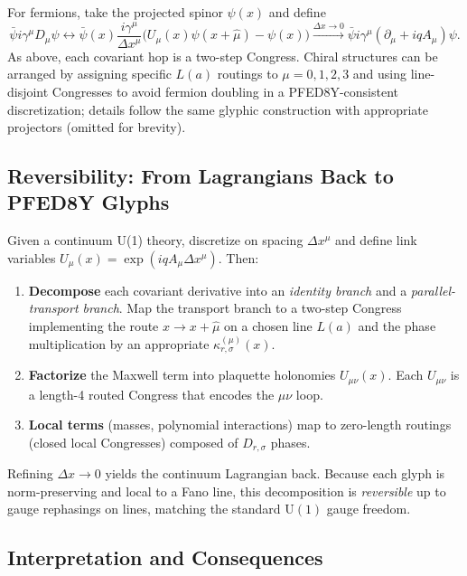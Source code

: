 \documentclass[pdflatex,sn-mathphys-num]{sn-jnl}
\theoremstyle{thmstyleone}
\theoremstyle{thmstyletwo}
\theoremstyle{thmstylethree}
\begin{document}
For fermions, take the projected spinor $\psi(x)$ and define
\begin{equation}
    \bar{\psi} i\gamma^\mu D_\mu\psi 
    \longleftrightarrow 
    \bar{\psi}(x) \frac{i\gamma^\mu}{\Delta x^\mu} \Big(U_\mu(x)\psi(x+\hat{\mu}) - \psi(x)\Big)
    \xrightarrow{\Delta x \to 0}
    \bar{\psi} i\gamma^\mu(\partial_\mu + iq A_\mu)\psi.
\end{equation}
As above, each covariant hop is a two-step Congress. Chiral structures can be arranged by assigning specific $L(a)$ routings to $\mu = 0,1,2,3$ and using line-disjoint Congresses to avoid fermion doubling in a PFED8Y-consistent discretization; details follow the same glyphic construction with appropriate projectors (omitted for brevity).

\subsection{Reversibility: From Lagrangians Back to PFED8Y Glyphs}
\label{subsec:reverse}

Given a continuum U(1) theory, discretize on spacing $\Delta x^\mu$ and define link variables $U_\mu(x) = \exp(iq A_\mu \Delta x^\mu)$. Then:

\begin{enumerate}
    \item \textbf{Decompose} each covariant derivative into an \emph{identity branch} and a \emph{parallel-transport branch}. Map the transport branch to a two-step Congress implementing the route $x \to x+\hat{\mu}$ on a chosen line $L(a)$ and the phase multiplication by an appropriate $\kappa_{r,\sigma}^{(\mu)}(x)$.
    
    \item \textbf{Factorize} the Maxwell term into plaquette holonomies $U_{\mu\nu}(x)$. Each $U_{\mu\nu}$ is a length-4 routed Congress that encodes the $\mu\nu$ loop.
    
    \item \textbf{Local terms} (masses, polynomial interactions) map to zero-length routings (closed local Congresses) composed of $D_{r,\sigma}$ phases.
\end{enumerate}

Refining $\Delta x \to 0$ yields the continuum Lagrangian back. Because each glyph is norm-preserving and local to a Fano line, this decomposition is \emph{reversible} up to gauge rephasings on lines, matching the standard $\mathrm{U}(1)$ gauge freedom.

\subsection{Interpretation and Consequences}
\end{document}
